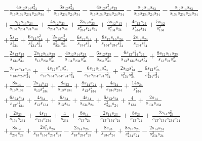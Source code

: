 \begin{align}
  & - \frac{4s_{12}s_{14}s_{23}^2}{s_{13}s_{134}s_{234}s_{24}s_{34}} + \frac{3s_{12}s_{23}^2}{s_{13}s_{234}s_{24}s_{34}} - \frac{4s_{12}s_{14}^2s_{23}}{s_{13}s_{134}s_{234}s_{24}s_{34}} - \frac{s_{12}s_{14}s_{23}}{s_{13}s_{234}s_{24}s_{34}} - \frac{s_{12}s_{14}s_{23}}{s_{134}s_{234}s_{24}s_{34}} \nonumber \\
  & + \frac{s_{12}s_{13}s_{23}}{s_{134}s_{234}s_{24}s_{34}} + \frac{4s_{12}s_{23}}{s_{234}s_{24}s_{34}} + \frac{3s_{12}s_{23}^2}{s_{234}^2s_{24}s_{34}} + \frac{5s_{12}s_{13}}{s_{134}^2s_{34}} + \frac{4s_{12}s_{23}}{s_{234}^2s_{34}} + \frac{5s_{12}}{s_{134}^2} \nonumber \\
  & + \frac{5s_{12}}{s_{234}^2} + \frac{6s_{12}s_{14}^2}{s_{134}^2s_{34}^2} + \frac{2s_{12}s_{24}^2}{s_{234}^2s_{34}^2} - \frac{6s_{12}s_{14}}{s_{134}s_{34}^2} + \frac{8s_{12}s_{13}s_{24}}{s_{134}s_{234}s_{34}^2} - \frac{2s_{12}s_{24}}{s_{234}s_{34}^2} \nonumber \\
  & - \frac{2s_{12}s_{13}}{s_{134}s_{34}^2} - \frac{2s_{12}s_{14}s_{23}}{s_{13}s_{234}s_{34}^2} + \frac{4s_{12}s_{14}s_{23}}{s_{134}s_{234}s_{34}^2} - \frac{6s_{12}s_{23}}{s_{234}s_{34}^2} - \frac{6s_{12}s_{14}^2s_{23}}{s_{13}s_{134}s_{24}s_{34}^2} + \frac{8s_{12}s_{14}s_{23}}{s_{13}s_{24}s_{34}^2} \nonumber \\
  & - \frac{2s_{12}s_{14}s_{23}}{s_{134}s_{24}s_{34}^2} + \frac{4s_{12}s_{14}^2s_{23}^2}{s_{13}s_{134}s_{234}s_{24}s_{34}^2} - \frac{6s_{12}s_{14}s_{23}^2}{s_{13}s_{234}s_{24}s_{34}^2} + \frac{2s_{12}s_{13}^2}{s_{134}^2s_{34}^2} + \frac{6s_{12}s_{23}^2}{s_{234}^2s_{34}^2} \nonumber \\
  & + \frac{8s_{14}}{s_{13}s_{134}} - \frac{2s_{14}s_{23}}{s_{13}s_{134}^2} + \frac{8s_{23}}{s_{13}s_{134}} + \frac{8s_{14}s_{24}}{s_{13}s_{134}^2} + \frac{4s_{24}}{s_{134}s_{234}} + \frac{14s_{24}}{s_{134}^2} \nonumber \\
  & + \frac{6s_{24}s_{34}}{s_{13}s_{134}^2} + \frac{4s_{34}}{s_{13}s_{134}} + \frac{6s_{34}}{s_{13}s_{24}} + \frac{4s_{34}}{s_{234}s_{24}} + \frac{6s_{13}s_{34}}{s_{234}^2s_{24}} + \frac{4}{s_{134}} + \frac{2s_{14}}{s_{134}s_{234}} \nonumber \\
  & + \frac{2s_{23}}{s_{134}s_{234}} + \frac{4s_{13}}{s_{134}s_{234}} + \frac{4}{s_{234}} + \frac{8s_{14}}{s_{13}s_{24}} - \frac{2s_{14}s_{23}}{s_{13}s_{134}s_{24}} + \frac{8s_{23}}{s_{13}s_{24}} + \frac{2s_{14}s_{23}^2}{s_{13}s_{134}s_{234}s_{24}} \nonumber \\
  & + \frac{8s_{14}}{s_{234}s_{24}} + \frac{2s_{14}^2s_{23}}{s_{13}s_{134}s_{234}s_{24}} - \frac{2s_{14}s_{23}}{s_{13}s_{234}s_{24}} + \frac{8s_{23}}{s_{234}s_{24}} + \frac{8s_{13}s_{23}}{s_{234}^2s_{24}} - \frac{2s_{14}s_{23}}{s_{234}^2s_{24}} \nonumber \\

\end{align}
